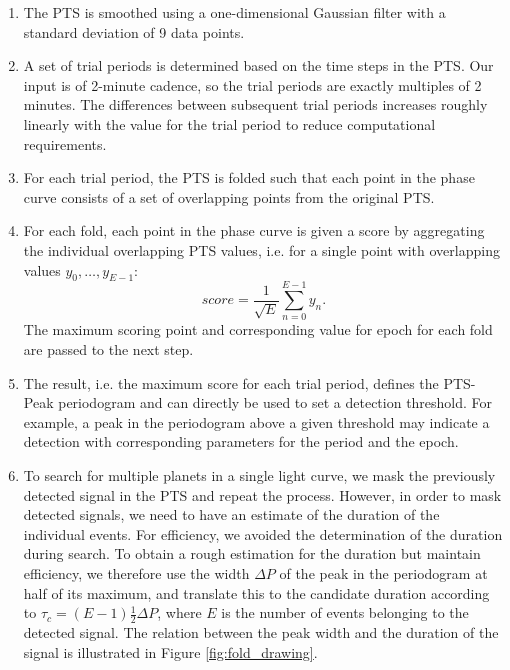 \begin{enumerate}
    \item The PTS is smoothed using a one-dimensional Gaussian filter with a standard deviation of 9 data points.
    \item A set of trial periods is determined based on the time steps in the PTS. Our input is of 2-minute cadence, so the trial periods are exactly multiples of 2 minutes. The differences between subsequent trial periods increases roughly linearly with the value for the trial period to reduce computational requirements.
    \item For each trial period, the PTS is folded such that each point in the phase curve consists of a set of overlapping points from the original PTS. 
    \item For each fold, each point in the phase curve is given a score by aggregating the individual overlapping PTS values, i.e. for a single point with overlapping values $y_0,\dots,y_{E-1}$:
    \begin{equation}
        score = \frac{1}{\sqrt{E}} \sum_{n=0}^{E-1}y_n.
    \end{equation}
    The maximum scoring point and corresponding value for epoch for each fold are passed to the next step. 
    \item The result, i.e. the maximum score for each trial period, defines the PTS-Peak periodogram and can directly be used to set a detection threshold. For example, a peak in the periodogram above a given threshold may indicate a detection with corresponding parameters for the period and the epoch.
    \item To search for multiple planets in a single light curve, we mask the previously detected signal in the PTS and repeat the process. However, in order to mask detected signals, we need to have an estimate of the duration of the individual events. For efficiency, we avoided the determination of the duration during search. To obtain a rough estimation for the duration but maintain efficiency, we therefore use the width $\Delta P$ of the peak in the periodogram at half of its maximum, and translate this to the candidate duration according to $\tau_c = (E-1)\frac{1}{2}\Delta P$, where $E$ is the number of events belonging to the detected signal. The relation between the peak width and the duration of the signal is illustrated in Figure \ref{fig:fold_drawing}.
    
    
\end{enumerate}


